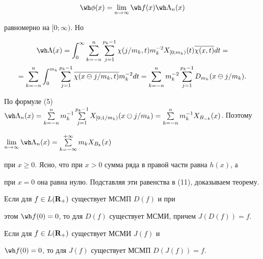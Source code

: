 \begin{equation}


{\wh\phi}(x)=\lim_{n\to\infty}{\wh f}(x){\wh\Lambda}_n(x)


\end{equation}


равномерно на $[0;\infty)$. Но 


\begin{multline*}


{\wh\Lambda}(x)=\int^{\infty}_0\sum^n_{k=-n}


\sum_{j=1}^{p_k-1}\chi(j/m_k,t)m_k^{-2}X_{[0;m_k)}(t)\overline{\chi(x,t)}dt=\\


%


=\sum_{k=-n}^n\int_0^{m_k}


\sum_{j=1}^{p_k-1}\overline{\chi(x\ominus j/m_k,t)}m_k^{-2}dt=


\sum^n_{k=-n}m_k^{-2}


\sum^{p_k-1}_{j=1}D_{m_k}(x\ominus j/m_k).


\end{multline*}


По формуле (5) \ ${\wh\Lambda}_n(x)=\sum\limits^n_{k=-n}m_k^{-1}


\sum\limits_{j=1}^{p_k-1}X_{[0;1/m_k)}(x\ominus j/m_k)=


\sum\limits^n_{k=-n}m_k^{-1}X_{B_{-k}}(x)$. Поэтому


$\lim\limits_{n\to\infty}{\wh\Lambda}_n(x)=


\sum\limits^{+\infty}_{k=-\infty}m_kX_{B_k}(x)$ 


при $x\geq 0$. Ясно, что при $x>0$ сумма ряда в правой части равна $h(x)$, а


при $x=0$ она равна нулю. Подставляя эти равенства в (11), доказываем теорему.








\begin{cors}


Если для $f\in L({\bold R}_+)$ существует МСМП $D(f)$ и при 


этом ${\wh f}(0)=0$, то для $D(f)$ существует МСМИ, причем $J(D(f))=f$.


\end{cors}








\begin{thms}


Если для $f\in L({\bold R}_+)$ существует МСМИ $J(f)$ и 


${\wh f}(0)=0$, то для $J(f)$ существует МСМП $D(J(f))=f$.


\end{thms}








